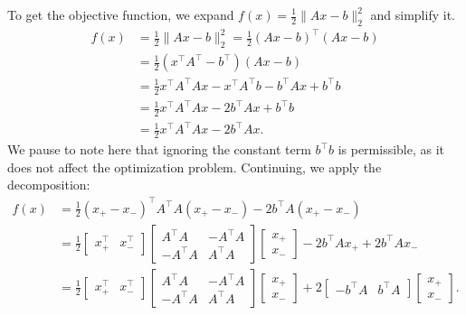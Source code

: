 \documentclass{letter}
\newcounter{problem}
\newcommand{\T}{\intercal}
\begin{document}
{    To get the objective function, we expand $f(x) = \frac{1}{2}\|Ax - b\|_2^2$ and simplify it. \begin{align*}
        f(x) &= \frac{1}{2}\|Ax - b\|_2^2 = \frac{1}{2}(Ax - b)^\T (Ax - b) \\
        &= \frac{1}{2}(x^\T A^\T - b^\T)(Ax - b) \\
        &= \frac{1}{2}x^\T A^\T A x - x^\T A^\T b - b^\T Ax + b^\T b \\
        &= \frac{1}{2}x^\T A^\T A x - 2b^\T Ax + b^\T b \\
        &= \frac{1}{2}x^\T A^\T A x - 2b^\T Ax.
    \end{align*} We pause to note here that ignoring the constant term $b^\T b$ is permissible, as it does not affect the optimization problem. Continuing, we apply the decomposition: \begin{align*}
        f(x) &= \frac{1}{2}(x_+ - x_-)^\T A^\T A (x_+ - x_-) - 2b^\T A(x_+ - x_-) \\
        &= \frac{1}{2}\begin{bmatrix} x^\T_+ & x^\T_- \end{bmatrix} \begin{bmatrix} A^\T A & -A^\T A \\ -A^\T A & A^\T A \end{bmatrix} \begin{bmatrix} x_+ \\ x_- \end{bmatrix} - 2b^\T Ax_+ + 2b^\T Ax_- \\
        &= \frac{1}{2}\begin{bmatrix} x^\T_+ & x^\T_- \end{bmatrix} \begin{bmatrix} A^\T A & -A^\T A \\ -A^\T A & A^\T A \end{bmatrix} \begin{bmatrix} x_+ \\ x_- \end{bmatrix} + 2\begin{bmatrix} -b^\T A & b^\T A \end{bmatrix} \begin{bmatrix} x_+ \\ x_- \end{bmatrix}. 
    \end{align*}

}
\end{document}

